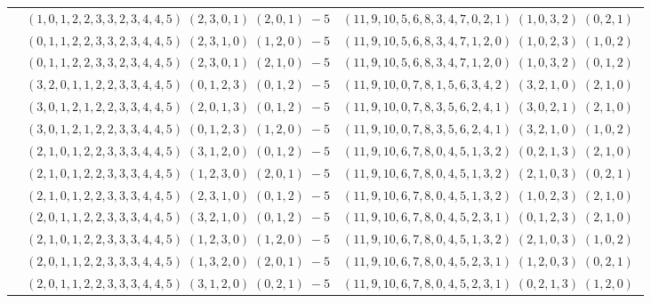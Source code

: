 \documentclass[11pt]{article}
\begin{document}
\begin{longtable}[l]{|c|c|c|}
 \cline{2-3} 
 & $(1 ,0 ,1 ,2 ,2 ,3 ,3 ,2 ,3 ,4 ,4 ,5) \;(2 ,3 ,0 ,1) \;(2 ,0 ,1) \;-5$ & $(11 ,9 ,10 ,5 ,6 ,8 ,3 ,4 ,7 ,0 ,2 ,1) \;(1 ,0 ,3 ,2) \;(0 ,2 ,1) \;$\\ 
 \cline{2-3} 
 & $(0 ,1 ,1 ,2 ,2 ,3 ,3 ,2 ,3 ,4 ,4 ,5) \;(2 ,3 ,1 ,0) \;(1 ,2 ,0) \;-5$ & $(11 ,9 ,10 ,5 ,6 ,8 ,3 ,4 ,7 ,1 ,2 ,0) \;(1 ,0 ,2 ,3) \;(1 ,0 ,2) \;$\\ 
 \cline{2-3} 
 & $(0 ,1 ,1 ,2 ,2 ,3 ,3 ,2 ,3 ,4 ,4 ,5) \;(2 ,3 ,0 ,1) \;(2 ,1 ,0) \;-5$ & $(11 ,9 ,10 ,5 ,6 ,8 ,3 ,4 ,7 ,1 ,2 ,0) \;(1 ,0 ,3 ,2) \;(0 ,1 ,2) \;$\\ 
 \cline{2-3} 
 & $(3 ,2 ,0 ,1 ,1 ,2 ,2 ,3 ,3 ,4 ,4 ,5) \;(0 ,1 ,2 ,3) \;(0 ,1 ,2) \;-5$ & $(11 ,9 ,10 ,0 ,7 ,8 ,1 ,5 ,6 ,3 ,4 ,2) \;(3 ,2 ,1 ,0) \;(2 ,1 ,0) \;$\\ 
 \cline{2-3} 
 & $(3 ,0 ,1 ,2 ,1 ,2 ,2 ,3 ,3 ,4 ,4 ,5) \;(2 ,0 ,1 ,3) \;(0 ,1 ,2) \;-5$ & $(11 ,9 ,10 ,0 ,7 ,8 ,3 ,5 ,6 ,2 ,4 ,1) \;(3 ,0 ,2 ,1) \;(2 ,1 ,0) \;$\\ 
 \cline{2-3} 
 & $(3 ,0 ,1 ,2 ,1 ,2 ,2 ,3 ,3 ,4 ,4 ,5) \;(0 ,1 ,2 ,3) \;(1 ,2 ,0) \;-5$ & $(11 ,9 ,10 ,0 ,7 ,8 ,3 ,5 ,6 ,2 ,4 ,1) \;(3 ,2 ,1 ,0) \;(1 ,0 ,2) \;$\\ 
 \cline{2-3} 
 & $(2 ,1 ,0 ,1 ,2 ,2 ,3 ,3 ,3 ,4 ,4 ,5) \;(3 ,1 ,2 ,0) \;(0 ,1 ,2) \;-5$ & $(11 ,9 ,10 ,6 ,7 ,8 ,0 ,4 ,5 ,1 ,3 ,2) \;(0 ,2 ,1 ,3) \;(2 ,1 ,0) \;$\\ 
 \cline{2-3} 
 & $(2 ,1 ,0 ,1 ,2 ,2 ,3 ,3 ,3 ,4 ,4 ,5) \;(1 ,2 ,3 ,0) \;(2 ,0 ,1) \;-5$ & $(11 ,9 ,10 ,6 ,7 ,8 ,0 ,4 ,5 ,1 ,3 ,2) \;(2 ,1 ,0 ,3) \;(0 ,2 ,1) \;$\\ 
 \cline{2-3} 
 & $(2 ,1 ,0 ,1 ,2 ,2 ,3 ,3 ,3 ,4 ,4 ,5) \;(2 ,3 ,1 ,0) \;(0 ,1 ,2) \;-5$ & $(11 ,9 ,10 ,6 ,7 ,8 ,0 ,4 ,5 ,1 ,3 ,2) \;(1 ,0 ,2 ,3) \;(2 ,1 ,0) \;$\\ 
 \cline{2-3} 
 & $(2 ,0 ,1 ,1 ,2 ,2 ,3 ,3 ,3 ,4 ,4 ,5) \;(3 ,2 ,1 ,0) \;(0 ,1 ,2) \;-5$ & $(11 ,9 ,10 ,6 ,7 ,8 ,0 ,4 ,5 ,2 ,3 ,1) \;(0 ,1 ,2 ,3) \;(2 ,1 ,0) \;$\\ 
 \cline{2-3} 
 & $(2 ,1 ,0 ,1 ,2 ,2 ,3 ,3 ,3 ,4 ,4 ,5) \;(1 ,2 ,3 ,0) \;(1 ,2 ,0) \;-5$ & $(11 ,9 ,10 ,6 ,7 ,8 ,0 ,4 ,5 ,1 ,3 ,2) \;(2 ,1 ,0 ,3) \;(1 ,0 ,2) \;$\\ 
 \cline{2-3} 
 & $(2 ,0 ,1 ,1 ,2 ,2 ,3 ,3 ,3 ,4 ,4 ,5) \;(1 ,3 ,2 ,0) \;(2 ,0 ,1) \;-5$ & $(11 ,9 ,10 ,6 ,7 ,8 ,0 ,4 ,5 ,2 ,3 ,1) \;(1 ,2 ,0 ,3) \;(0 ,2 ,1) \;$\\ 
 \cline{2-3} 
 & $(2 ,0 ,1 ,1 ,2 ,2 ,3 ,3 ,3 ,4 ,4 ,5) \;(3 ,1 ,2 ,0) \;(0 ,2 ,1) \;-5$ & $(11 ,9 ,10 ,6 ,7 ,8 ,0 ,4 ,5 ,2 ,3 ,1) \;(0 ,2 ,1 ,3) \;(1 ,2 ,0) \;$\\ 

\end{longtable}
\end{document}

